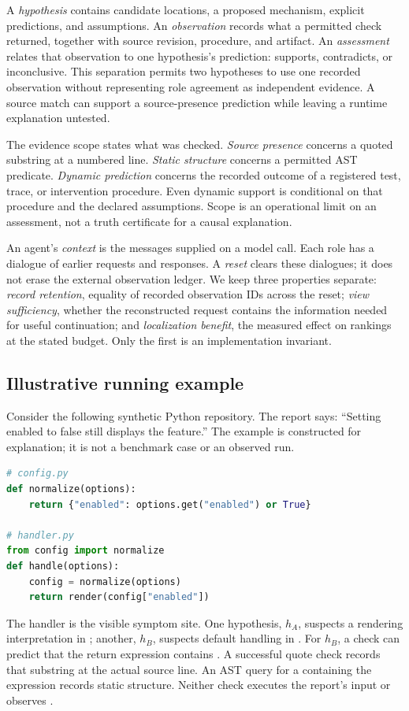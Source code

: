 \documentclass[letterpaper,journal]{IEEEtran}
\newcommand{\code}[1]{\texttt{\detokenize{#1}}}
\begin{document}
A \emph{hypothesis} contains candidate locations, a proposed mechanism, explicit predictions, and assumptions. An \emph{observation} records what a permitted check returned, together with source revision, procedure, and artifact. An \emph{assessment} relates that observation to one hypothesis's prediction: supports, contradicts, or inconclusive. This separation permits two hypotheses to use one recorded observation without representing role agreement as independent evidence. A source match can support a source-presence prediction while leaving a runtime explanation untested.

The evidence scope states what was checked. \emph{Source presence} concerns a quoted substring at a numbered line. \emph{Static structure} concerns a permitted AST predicate. \emph{Dynamic prediction} concerns the recorded outcome of a registered test, trace, or intervention procedure. Even dynamic support is conditional on that procedure and the declared assumptions. Scope is an operational limit on an assessment, not a truth certificate for a causal explanation.

An agent's \emph{context} is the messages supplied on a model call. Each role has a dialogue of earlier requests and responses. A \emph{reset} clears these dialogues; it does not erase the external observation ledger. We keep three properties separate: \emph{record retention}, equality of recorded observation IDs across the reset; \emph{view sufficiency}, whether the reconstructed request contains the information needed for useful continuation; and \emph{localization benefit}, the measured effect on rankings at the stated budget. Only the first is an implementation invariant.

\subsection{Illustrative running example}\label{sec:example}
Consider the following synthetic Python repository. The report says: ``Setting enabled to false still displays the feature.'' The example is constructed for explanation; it is not a benchmark case or an observed run.
\begin{lstlisting}[language=Python,caption={Illustrative pre-fix source in two files.},label={lst:example}]
# config.py
def normalize(options):
    return {"enabled": options.get("enabled") or True}

# handler.py
from config import normalize
def handle(options):
    config = normalize(options)
    return render(config["enabled"])
\end{lstlisting}
The handler is the visible symptom site. One hypothesis, $h_A$, suspects a rendering interpretation in \code{handler.py}; another, $h_B$, suspects default handling in \code{config.py}. For $h_B$, a check can predict that the return expression contains \code{or True}. A successful quote check records that substring at the actual source line. An AST query for a \code{Return} containing the expression records static structure. Neither check executes the report's input or observes \code{render}.
\end{document}
